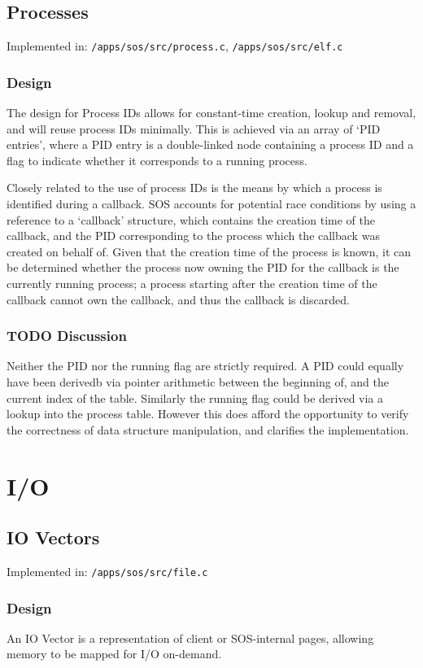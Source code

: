 \documentclass[a4paper,12pt]{article}
\begin{document}
\subsection{Processes}
Implemented in: \texttt{/apps/sos/src/process.c}, \texttt{/apps/sos/src/elf.c}

\subsubsection{Design}
The design for Process IDs allows for constant-time creation, lookup and
removal, and will reuse process IDs minimally.  This is achieved via an array
of `PID entries', where a PID entry is a double-linked node containing a
process ID and a flag to indicate whether it corresponds to a running process.

Closely related to the use of process IDs is the means by which a process is
identified during a callback.  SOS accounts for potential race conditions by
using a reference to a `callback' structure, which contains the creation time
of the callback, and the PID corresponding to the process which the callback
was created on behalf of.  Given that the creation time of the process is
known, it can be determined whether the process now owning the PID for the
callback is the currently running process; a process starting after the
creation time of the callback cannot own the callback, and thus the callback
is discarded.

\subsubsection{TODO Discussion}
Neither the PID nor the running flag are strictly required.  A PID could
equally have been derivedb via pointer arithmetic between the beginning of,
and the current index of the table.  Similarly the running flag could be
derived via a lookup into the process table.  However this does afford the
opportunity to verify the correctness of data structure manipulation, and
clarifies the implementation.

\section{I/O}
\subsection{IO Vectors}
Implemented in: \texttt{/apps/sos/src/file.c}

\subsubsection{Design}
An IO Vector is a representation of client or SOS-internal pages, allowing
memory to be mapped for I/O on-demand.
\end{document}
